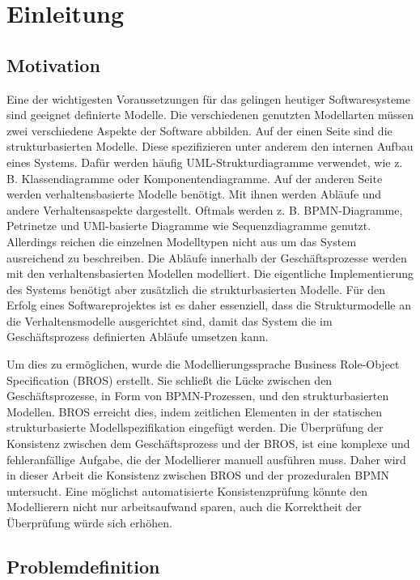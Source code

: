\chapter{Einleitung}
\label{chap:introduction}

\section{Motivation}

Eine der wichtigesten Voraussetzungen für das gelingen heutiger Softwaresysteme sind geeignet definierte Modelle.
Die verschiedenen genutzten Modellarten müssen zwei verschiedene Aspekte der Software abbilden.
Auf der einen Seite sind die strukturbasierten Modelle.
Diese spezifizieren unter anderem den internen Aufbau eines Systems.
Dafür werden häufig UML-Strukturdiagramme verwendet, wie z. B. Klassendiagramme oder Komponentendiagramme.
Auf der anderen Seite werden verhaltensbasierte Modelle benötigt.
Mit ihnen werden Abläufe und andere Verhaltensaspekte dargestellt.
Oftmals werden z. B. BPMN-Diagramme, Petrinetze und UMl-basierte Diagramme wie Sequenzdiagramme genutzt.
Allerdings reichen die einzelnen Modelltypen nicht aus um das System ausreichend zu beschreiben.
Die Abläufe innerhalb der Geschäftsprozesse werden mit den verhaltensbasierten Modellen modelliert.
Die eigentliche Implementierung des Systems benötigt aber zusätzlich die strukturbasierten Modelle.
Für den Erfolg eines Softwareprojektes ist es daher essenziell, dass die Strukturmodelle an die Verhaltensmodelle ausgerichtet sind, damit das System die im Geschäftsprozess definierten Abläufe umsetzen kann.

Um dies zu ermöglichen, wurde die Modellierungssprache Business Role-Object Specification (BROS) erstellt.
Sie schließt die Lücke zwischen den Geschäftsprozesse, in Form von BPMN-Prozessen, und den  strukturbasierten Modellen.
BROS erreicht dies, indem zeitlichen Elementen in der statischen strukturbasierte Modellspezifikation eingefügt werden.
Die Überprüfung der Konsistenz zwischen dem Geschäftsprozess und der BROS, ist eine komplexe und fehleranfällige Aufgabe, die der Modellierer manuell ausführen muss.
Daher wird in dieser Arbeit die Konsistenz zwischen BROS und der prozeduralen BPMN untersucht.
Eine möglichst automatisierte Konsistenzprüfung könnte den Modellierern nicht nur arbeitsaufwand sparen, auch die Korrektheit der Überprüfung würde sich erhöhen.

\section{Problemdefinition}

